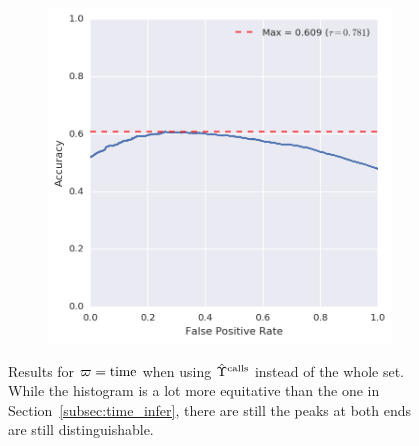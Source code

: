 \begin{figure}[p]
\begin{subfigure}[b]{.49\textwidth}
	\includegraphics[height=.20\textheight]{figures/bayes/least1/accuracy_time.png}
\end{subfigure}
\caption{Results for $\varpi = \operatorname{time}$ when using $\hat{\Upsilon}^{\operatorname{calls}}$ instead of the whole set. While the histogram is a lot more equitative than the one in Section~\ref{subsec:time_infer}, there are still the peaks at both ends are still distinguishable.}
\label{fig:time_infer_positive}
\end{figure}

